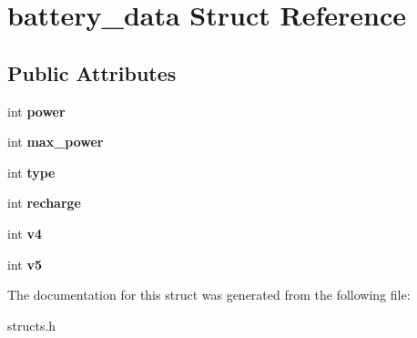 \hypertarget{structbattery__data}{\section{battery\-\_\-data Struct Reference}
\label{structbattery__data}
}
\subsection*{Public Attributes}
\begin{DoxyCompactItemize}
\item 
\hypertarget{structbattery__data_aeb2fd557f78d85839b850d7ffd9f3c46}{int {\bfseries power}}\label{structbattery__data_aeb2fd557f78d85839b850d7ffd9f3c46}

\item 
\hypertarget{structbattery__data_ad7b2bab9e7affed36c413eaa3279af39}{int {\bfseries max\-\_\-power}}\label{structbattery__data_ad7b2bab9e7affed36c413eaa3279af39}

\item 
\hypertarget{structbattery__data_a519024cb41f6c619235bf7bf439a8918}{int {\bfseries type}}\label{structbattery__data_a519024cb41f6c619235bf7bf439a8918}

\item 
\hypertarget{structbattery__data_a3daf050843a0b85ac7c60f4ba699d983}{int {\bfseries recharge}}\label{structbattery__data_a3daf050843a0b85ac7c60f4ba699d983}

\item 
\hypertarget{structbattery__data_a848dcb38b4ee080b33794822887f789c}{int {\bfseries v4}}\label{structbattery__data_a848dcb38b4ee080b33794822887f789c}

\item 
\hypertarget{structbattery__data_a9e9ab46e28e3fcab7b29ed51210b3675}{int {\bfseries v5}}\label{structbattery__data_a9e9ab46e28e3fcab7b29ed51210b3675}

\end{DoxyCompactItemize}


The documentation for this struct was generated from the following file\-:\begin{DoxyCompactItemize}
\item 
structs.\-h\end{DoxyCompactItemize}
